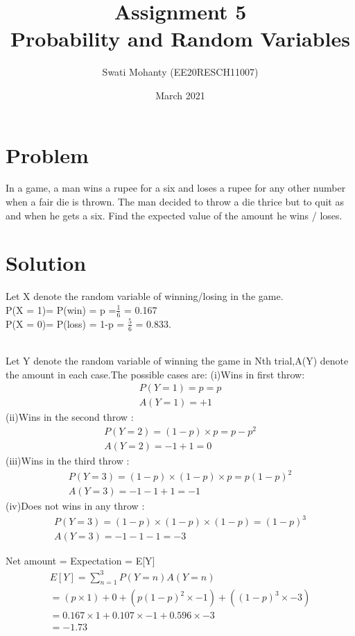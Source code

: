 \documentclass[journal,12pt,twocolumn]{IEEEtran}
\title{Assignment 5
\\Probability and Random Variables }
\author{Swati Mohanty (EE20RESCH11007) }
\date{March 2021}
\begin{document}
\maketitle


\section{Problem}
In a game, a man wins a rupee for a six and
loses a rupee for any other number when a
fair die is thrown. The man decided to throw
a die thrice but to quit as and when he gets a
six. Find the expected value of the amount he
wins / loses.

\section{Solution}
Let X denote the random variable of winning/losing in the game.
\\P(X = 1)= P(win) = p =$\frac{1}{6}$  = 0.167
\\P(X = 0)= P(loss) = 1-p = $\frac{5}{6}$ = 0.833.
 
\\Let Y denote the random variable of winning the game in Nth trial,A(Y) denote the amount in each case.The possible cases are:
(i)Wins in first throw:\begin{align}
    P(Y=1) = p = p
    \\A(Y=1) = +1
\end{align}
(ii)Wins in the second throw :\begin{align}
    P(Y=2) = (1-p)\times p = p-p^2
    \\A(Y=2) = -1+1=0
\end{align}
(iii)Wins in the third throw :\begin{align}
    P(Y=3) = (1-p)\times(1-p)\times p = p(1-p)^2
    \\A(Y=3) = -1-1+1=-1
\end{align}
(iv)Does not wins in any throw :\begin{align}
    P(Y=3) = (1-p)\times(1-p)\times (1-p) = (1-p)^3
    \\A(Y=3) = -1-1-1=-3
\end{align}

Net amount = Expectation = E[Y] 
\begin{align}
    E[Y] =  \sum_{n=1}^{3} P(Y=n)A(Y=n)
    \\= (p\times 1) +0 + (p(1-p)^2 \times -1) +((1-p)^3\times -3)
    \\=0.167\times1 +0.107\times-1 + 0.596\times-3
    \\=-1.73
\end{align}
\end{document}
